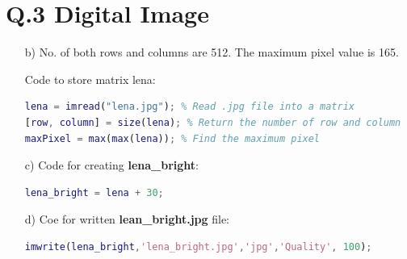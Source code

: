 \documentclass{article}
\begin{document}
	\section*{Q.3 Digital Image}
	\begin{enumerate}
		\item[b)] No. of both rows and columns are 512. The maximum pixel value is 165.

		Code to store matrix lena:
\begin{lstlisting}[language=Matlab]
lena = imread("lena.jpg"); % Read .jpg file into a matrix
[row, column] = size(lena); % Return the number of row and column
maxPixel = max(max(lena)); % Find the maximum pixel
\end{lstlisting}

		\item[c)] Code for creating \textbf{lena\_bright}:
		
\begin{lstlisting}[language=Matlab]
% Create a brighter version of the .jpg file
lena_bright = lena + 30;
\end{lstlisting}

		\item[d)] Coe for written \textbf{lean\_bright.jpg} file:
\begin{lstlisting}[language=Matlab]
% Write the matrix into a .jpg file
imwrite(lena_bright,'lena_bright.jpg','jpg','Quality', 100);
\end{lstlisting}

	\end{enumerate}
\end{document}
